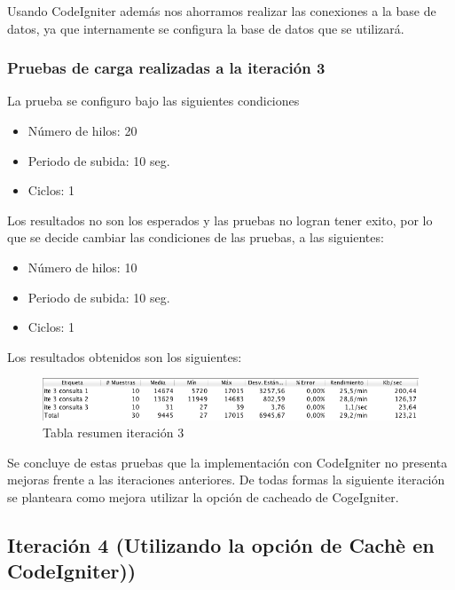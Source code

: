  Usando CodeIgniter además nos ahorramos realizar las conexiones a la base de datos, ya que internamente se configura la base de datos que se utilizará. 
 
\subsubsection{Pruebas de carga realizadas a la iteración 3}
 
La prueba se configuro bajo las siguientes condiciones

\begin{itemize}
	\item Número de hilos: 20
	\item Periodo de subida: 10 seg.
	\item Ciclos: 1
\end{itemize}

Los resultados no son los esperados y las pruebas no logran tener exito, por lo que se decide cambiar las condiciones de las pruebas, a las siguientes:

\begin{itemize}
	\item Número de hilos: 10
	\item Periodo de subida: 10 seg.
	\item Ciclos: 1
\end{itemize}
 
Los resultados obtenidos son los siguientes:
 
 \begin{figure}[htb]
 	\label{Figura12}
 	\begin{center}
 		\includegraphics[scale=0.6]{imagenes/ite3.png}
 		\caption{Tabla resumen iteración 3}
 	\end{center}
 \end{figure}

 Se concluye de estas pruebas que la implementación con CodeIgniter no presenta mejoras frente a las iteraciones anteriores. De todas formas la siguiente iteración se planteara como mejora utilizar la opción de cacheado de CogeIgniter.
 
 \subsection{Iteración 4 (Utilizando la opción de Cachè en CodeIgniter))}
 
